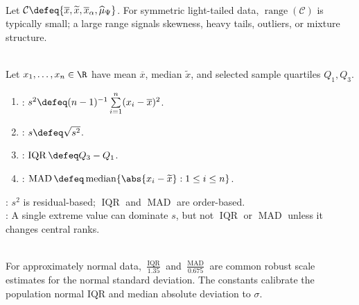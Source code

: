 \begin{remark} \label{rem:compare-multiple-location-summaries} \\
Let $\mathcal{C}\defeq\{\overline{x},\widetilde{x},\overline{x}_\alpha,\widehat{\mu}_\Psi\}$. For symmetric light-tailed data, $\operatorname{range}(\mathcal{C})$ is typically small; a large range signals skewness, heavy tails, outliers, or mixture structure.
\end{remark}

\begin{definition} \label{def:dispersion-summaries-for-data} \\
Let $x_1,\ldots,x_n\in\R$ have mean $\overline{x}$, median $\widetilde{x}$, and selected sample quartiles $Q_1,Q_3$.
\begin{enumerate}[label=(\roman*)]
\setlength{\itemsep}{0pt}
\item {}: $s^2\defeq(n-1)^{-1}\sum\limits_{i=1}^n(x_i-\overline{x})^2$.
\item {}: $s\defeq\sqrt{s^2}$.
\item {}: $\operatorname{IQR}\defeq Q_3-Q_1$.
\item {}: $\operatorname{MAD}\defeq\operatorname{median}\{\abs{x_i-\widetilde{x}}:1\leq i\leq n\}$.
\end{enumerate}
: $s^2$ is residual-based; $\operatorname{IQR}$ and $\operatorname{MAD}$ are order-based.\\
: A single extreme value can dominate $s$, but not $\operatorname{IQR}$ or $\operatorname{MAD}$ unless it changes central ranks.
\end{definition}

\begin{remark} \label{rem:normal-scale-calibrations} \\
For approximately normal data, $\frac{\operatorname{IQR}}{1.35}$ and $\frac{\operatorname{MAD}}{0.675}$ are common robust scale estimates for the normal standard deviation. The constants calibrate the population normal IQR and median absolute deviation to $\sigma$.
\end{remark}
